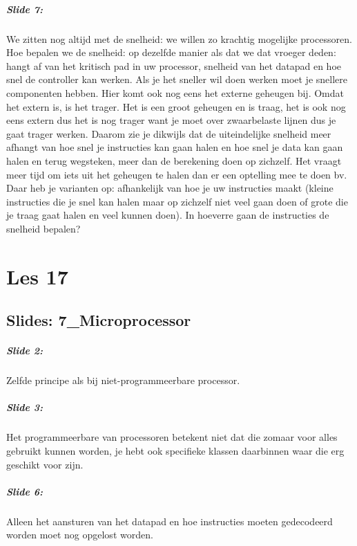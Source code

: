 \documentclass[10pt,a4paper]{book}
\begin{document}
\paragraph{Slide 7:} We zitten nog altijd met de snelheid: we willen zo krachtig mogelijke processoren. Hoe bepalen we de snelheid: op dezelfde manier als dat we dat vroeger deden: hangt af van het kritisch pad in uw processor, snelheid van het datapad en hoe snel de controller kan werken. Als je het sneller wil doen werken moet je snellere componenten hebben. Hier komt ook nog eens het externe geheugen bij. Omdat het extern is, is het trager. Het is een groot geheugen en is traag, het is ook nog eens extern dus het is nog trager want je moet over zwaarbelaste lijnen dus je gaat trager werken. Daarom zie je dikwijls dat de uiteindelijke snelheid meer afhangt van hoe snel je instructies kan gaan halen en hoe snel je data kan gaan halen en terug wegsteken, meer dan de berekening doen op zichzelf. Het vraagt meer tijd om iets uit het geheugen te halen dan er een optelling mee te doen bv. Daar heb je varianten op: afhankelijk van hoe je uw instructies maakt (kleine instructies die je snel kan halen maar op zichzelf niet veel gaan doen of grote die je traag gaat halen en veel kunnen doen). In hoeverre gaan de instructies de snelheid bepalen?

\chapter{Les 17}

\section{Slides: 7\_Microprocessor} 

\paragraph{Slide 2:}  Zelfde principe als bij niet-programmeerbare processor.

\paragraph{Slide 3:} Het programmeerbare van processoren betekent niet dat die zomaar voor alles gebruikt kunnen worden, je hebt ook specifieke klassen daarbinnen waar die erg geschikt voor zijn.

\paragraph{Slide 6:} Alleen het aansturen van het datapad en hoe instructies moeten gedecodeerd worden moet nog opgelost worden.
\end{document}
